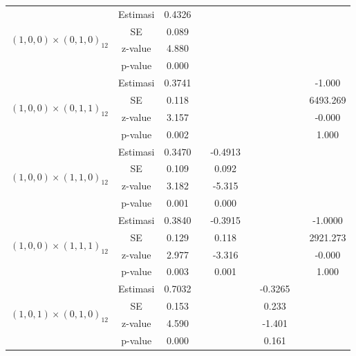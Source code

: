 \begin{enumerate}[label=\alph*.]
\begin{longtable}{|c|c|c|c|c|c|c|c|c|}
            \multirow{4}{*}{$(1,0,0)\times(0,1,0)_{12}$}
            & Estimasi & 0.4326  & {} & {} & {} & {} & {} & {} \\ \cline{2-9}
            & SE       & 0.089  & {} & {} & {} & {} & {} & {} \\ \cline{2-9}
            & z-value  & 4.880   & {} & {} & {} & {} & {} & {} \\ \cline{2-9}
            & p-value  & 0.000 & {} & {} & {} & {} & {} & {} \\ \hline

            \multirow{4}{*}{$(1,0,0)\times(0,1,1)_{12}$}
            & Estimasi & 0.3741  & {} & {} & {} & {} & {} & -1.000 \\ \cline{2-9}
            & SE       & 0.118  & {} & {} & {} & {} & {} & 6493.269\\ \cline{2-9}
            & z-value  & 3.157   & {} & {} & {} & {} & {} & -0.000\\ \cline{2-9}
            & p-value  & 0.002 & {} & {} & {} & {} & {} & 1.000\\ \hline

            \multirow{4}{*}{$(1,0,0)\times(1,1,0)_{12}$}
            & Estimasi & 0.3470 & {} & -0.4913 & {} & {} & {} & {}\\ \cline{2-9}
            & SE       & 0.109  & {} & 0.092 & {} & {} & {} & {}\\ \cline{2-9}
            & z-value  & 3.182   & {} & -5.315 & {} & {} & {}& {}\\ \cline{2-9}
            & p-value  & 0.001 & {} & 0.000 & {} & {} & {} & {}\\ \hline

            \multirow{4}{*}{$(1,0,0)\times(1,1,1)_{12}$}
            & Estimasi & 0.3840  & {} & -0.3915 & {} & {} & {} & -1.0000 \\ \cline{2-9}
            & SE       & 0.129    & {} & 0.118 & {} & {} & {} & 2921.273\\ \cline{2-9}
            & z-value  & 2.977   & {} & -3.316 & {} & {} & {} & -0.000\\ \cline{2-9}
            & p-value  & 0.003    & {} &  0.001 & {} & {} & {} & 1.000\\ \hline

            \multirow{4}{*}{$(1,0,1)\times(0,1,0)_{12}$}
            & Estimasi & 0.7032  & {} & {} & {} & -0.3265 & {} & {}\\ \cline{2-9}
            & SE       & 0.153 & {} & {} & {} & 0.233 & {} & {}\\ \cline{2-9}
            & z-value  & 4.590   & {} & {} & {} & -1.401 & {}& {}\\ \cline{2-9}
            & p-value  & 0.000 & {} & {} & {} & 0.161 & {} & {}\\ \hline


\end{longtable}
\end{enumerate}
